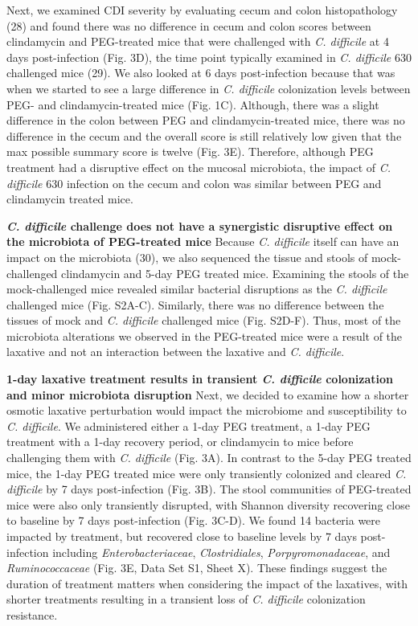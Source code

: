 \documentclass[
  11pt,
]{article}
\begin{document}
Next, we examined CDI severity by evaluating cecum and colon
histopathology (28) and found there was no difference in cecum and colon
scores between clindamycin and PEG-treated mice that were challenged
with \emph{C. difficile} at 4 days post-infection (Fig. 3D), the time
point typically examined in \emph{C. difficile} 630 challenged mice
(29). We also looked at 6 days post-infection because that was when we
started to see a large difference in \emph{C. difficile} colonization
levels between PEG- and clindamycin-treated mice (Fig. 1C). Although,
there was a slight difference in the colon between PEG and
clindamycin-treated mice, there was no difference in the cecum and the
overall score is still relatively low given that the max possible
summary score is twelve (Fig. 3E). Therefore, although PEG treatment had
a disruptive effect on the mucosal microbiota, the impact of \emph{C.
difficile} 630 infection on the cecum and colon was similar between PEG
and clindamycin treated mice.

\textbf{\emph{C. difficile} challenge does not have a synergistic
disruptive effect on the microbiota of PEG-treated mice} Because
\emph{C. difficile} itself can have an impact on the microbiota (30), we
also sequenced the tissue and stools of mock-challenged clindamycin and
5-day PEG treated mice. Examining the stools of the mock-challenged mice
revealed similar bacterial disruptions as the \emph{C. difficile}
challenged mice (Fig. S2A-C). Similarly, there was no difference between
the tissues of mock and \emph{C. difficile} challenged mice (Fig.
S2D-F). Thus, most of the microbiota alterations we observed in the
PEG-treated mice were a result of the laxative and not an interaction
between the laxative and \emph{C. difficile}.

\textbf{1-day laxative treatment results in transient \emph{C.
difficile} colonization and minor microbiota disruption} Next, we
decided to examine how a shorter osmotic laxative perturbation would
impact the microbiome and susceptibility to \emph{C. difficile}. We
administered either a 1-day PEG treatment, a 1-day PEG treatment with a
1-day recovery period, or clindamycin to mice before challenging them
with \emph{C. difficile} (Fig. 3A). In contrast to the 5-day PEG treated
mice, the 1-day PEG treated mice were only transiently colonized and
cleared \emph{C. difficile} by 7 days post-infection (Fig. 3B). The
stool communities of PEG-treated mice were also only transiently
disrupted, with Shannon diversity recovering close to baseline by 7 days
post-infection (Fig. 3C-D). We found 14 bacteria were impacted by
treatment, but recovered close to baseline levels by 7 days
post-infection including \emph{Enterobacteriaceae},
\emph{Clostridiales}, \emph{Porpyromonadaceae}, and
\emph{Ruminococcaceae} (Fig. 3E, Data Set S1, Sheet X). These findings
suggest the duration of treatment matters when considering the impact of
the laxatives, with shorter treatments resulting in a transient loss of
\emph{C. difficile} colonization resistance.
\end{document}
